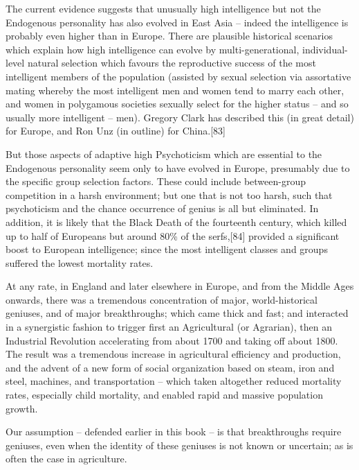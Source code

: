 \documentclass[
]{book}
\begin{document}
The current evidence suggests that unusually high intelligence but not the Endogenous personality has also evolved in East Asia -- indeed the intelligence is probably even higher than in Europe. There are plausible historical scenarios which explain how high intelligence can evolve by multi-generational, individual-level natural selection which favours the reproductive success of the most intelligent members of the population (assisted by sexual selection via assortative mating whereby the most intelligent men and women tend to marry each other, and women in polygamous societies sexually select for the higher status -- and so usually more intelligent -- men). Gregory Clark has described this (in great detail) for Europe, and Ron Unz (in outline) for China.{[}83{]}

But those aspects of adaptive high Psychoticism which are essential to the Endogenous personality seem only to have evolved in Europe, presumably due to the specific group selection factors. These could include between-group competition in a harsh environment; but one that is not too harsh, such that psychoticism and the chance occurrence of genius is all but eliminated. In addition, it is likely that the Black Death of the fourteenth century, which killed up to half of Europeans but around 80\% of the serfs,{[}84{]} provided a significant boost to European intelligence; since the most intelligent classes and groups suffered the lowest mortality rates.

At any rate, in England and later elsewhere in Europe, and from the Middle Ages onwards, there was a tremendous concentration of major, world-historical geniuses, and of major breakthroughs; which came thick and fast; and interacted in a synergistic fashion to trigger first an Agricultural (or Agrarian), then an Industrial Revolution accelerating from about 1700 and taking off about 1800. The result was a tremendous increase in agricultural efficiency and production, and the advent of a new form of social organization based on steam, iron and steel, machines, and transportation -- which taken altogether reduced mortality rates, especially child mortality, and enabled rapid and massive population growth.

Our assumption -- defended earlier in this book -- is that breakthroughs require geniuses, even when the identity of these geniuses is not known or uncertain; as is often the case in agriculture.
\end{document}
